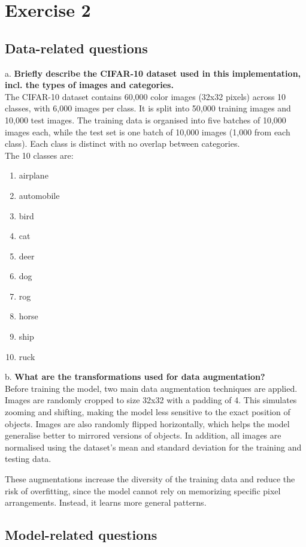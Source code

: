 \section*{Exercise 2}
\subsection*{Data-related questions}

a. \textbf{Briefly describe the CIFAR-10 dataset used in this implementation, incl. the types of images and categories.}\\
The CIFAR-10 dataset contains 60,000 color images (32x32 pixels) across 10 classes, with 6,000 images per class. It is split into 50,000 training images and 10,000 test images.
The training data is organised into five batches of 10,000 images each, while the test set is one batch of 10,000 images (1,000 from each class). Each class is distinct with no overlap between categories.\\
The 10 classes are:
\begin{enumerate}
	\item airplane
	\item automobile
	\item bird
	\item  cat
	\item  deer
	\item  dog
	\item rog
	\item horse
	\item ship
	\item ruck
\end{enumerate}
b. \textbf{What are the transformations used for data augmentation?} \\
Before training the model, two main data augmentation techniques are applied. Images are randomly cropped to size 32x32 with a padding of 4. This simulates zooming and shifting, making the model less sensitive to the exact position of objects. Images are also randomly flipped horizontally, which helps the model generalise better to mirrored versions of objects.
In addition, all images are  normalised using the dataset's mean and standard deviation for the training and testing data.

These augmentations increase the diversity of the training data and reduce the risk of overfitting, since the model cannot rely on memorizing specific pixel arrangements. Instead, it learns more general patterns.
\subsection*{Model-related questions}

